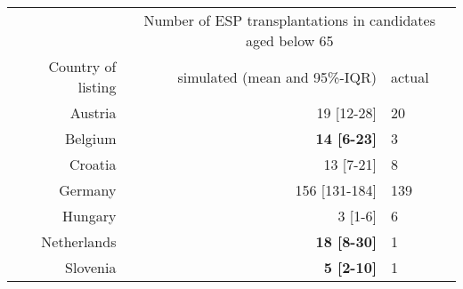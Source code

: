 
\begin{tabular}{rrl}
	\toprule
	\multicolumn{1}{c}{ } & \multicolumn{2}{c}{Number of ESP transplantations in candidates aged below 65} \\
	\cmidrule(l{3pt}r{3pt}){2-3}
	Country of listing & simulated
	(mean and 95\%-IQR) & actual\\
	\midrule
	Austria & 19 [12-28] & 20\\
	Belgium & \textbf{14 [6-23]} & 3\\
	Croatia & 13 [7-21] & 8\\
	Germany & 156 [131-184] & 139\\
	Hungary & 3 [1-6] & 6\\
	\addlinespace
	Netherlands & \textbf{18 [8-30]} & 1\\
	Slovenia & \textbf{5 [2-10]} & 1\\
	\bottomrule
\end{tabular}
